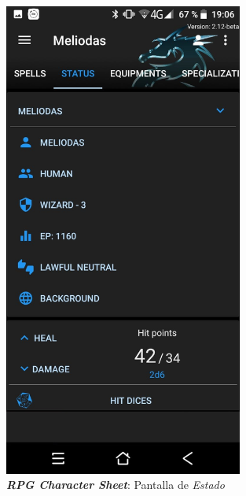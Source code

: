 \begin{figure}[H]
    \centering
    \begin{minipage}{0.3\textwidth}
        \centering
        \includegraphics[width=0.7\textwidth]{Images/RPG_Character_Sheet_1.jpeg}
        \caption{\textit{\textbf{RPG Character Sheet}}: Pantalla de \textit{Estado}}
        \label{RPGCharacterSheet1}
    \end{minipage} \hspace{2cm}
    \begin{minipage}{0.3\textwidth}
        \centering

\end{minipage}
\end{figure}
